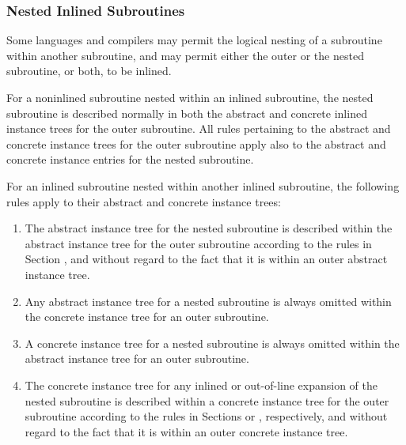 \subsubsection{Nested Inlined Subroutines}
\label{nestedinlinedsubroutines}
Some languages and compilers may permit the logical nesting of
a subroutine within another subroutine, and may permit either
the outer or the nested subroutine, or both, to be inlined.

For a non\dash inlined subroutine nested within an inlined
subroutine, the nested subroutine is described normally in
both the abstract and concrete inlined instance trees for
the outer subroutine. All rules pertaining to the abstract
and concrete instance trees for the outer subroutine apply
also to the abstract and concrete instance entries for the
nested subroutine.

For an inlined subroutine nested within another inlined
subroutine, the following rules apply to their abstract and
concrete instance trees:

\begin{enumerate}[1. ]
\item The abstract instance tree for the nested subroutine is
described within the abstract instance tree for the outer
subroutine according to the rules in 
Section , and
without regard to the fact that it is within an outer abstract
instance tree.

\item Any abstract instance tree for a nested subroutine is
always omitted within the concrete instance tree for an
outer subroutine.

\item  A concrete instance tree for a nested subroutine is
always omitted within the abstract instance tree for an
outer subroutine.

\item The concrete instance tree for any inlined or 
out-of-line
expansion of the nested subroutine is described within a
concrete instance tree for the outer subroutine according
to the rules in 
Sections  or 
, respectively,
and without regard to the fact that it is within an outer
concrete instance tree.
\end{enumerate}

